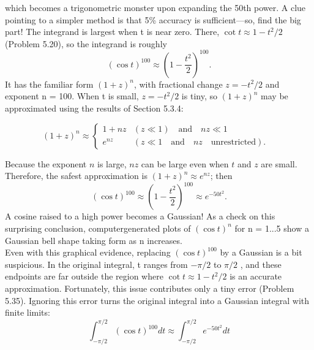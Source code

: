 \documentclass[fleqn]{book}
\newcounter{pro1}
\begin{document}
\Large \textrm{which becomes a trigonometric monster upon expanding the 50th power. 
A clue pointing to a simpler method is that 5\% accuracy is sufficient—so, 
find the big part! The integrand is largest when t is near zero. There,
$\cot t \approx 1-t^{2}/2$ (Problem 5.20), so the integrand is roughly}
\begin{equation}
(\cos t)^{100}\approx \left (1- \frac{t^{2}}{2} \right )^{100} . 
\end{equation}
\Large\textrm{It has the familiar form $(1 + z)^{n}$, with fractional change $z = −t^{2}/2$ and 
exponent n = 100. When t is small, $z = −t^{2}/2$ is tiny, so $(1 + z)^{n}$ may be 
approximated using the results of Section 5.3.4:}
\begin{flushleft}
\begin{equation}
 (1+z)^{n}\approx \left\{\begin{matrix} 1+nz &  (z\ll 1) \quad \textrm{and} \quad nz\ll 1 &\\ e ^{nz}& (z\ll 1 \quad \textrm{and} \quad nz \quad \textrm{unrestricted}) .& \end{matrix}\right.  
\end{equation}
\end{flushleft}
\Large \textrm{Because the exponent $n$ is large, $nz$ can be large even when $t$ and $z$ are 
small. Therefore, the safest approximation is $(1 + z)^{n}\approx e ^{nz}$; then} 
\begin{equation}
(\cos t)^{100}\approx \left (1- \frac{t^{2}}{2} \right )^{100} \approx e ^{-50t^{2}} .
\end{equation}
\Large\textrm{A cosine raised to a high power becomes a Gaussian! 
As a check on this surprising conclusion, computergenerated plots of $(\cos t)^{n}$ for n = 1...5 show a 
Gaussian bell shape taking form as n increases. \\
Even with this graphical evidence, replacing $(\cos t)^{100}$ by a Gaussian is a 
bit suspicious. In the original integral, t ranges from $-\pi /2$ to $\pi /2$ , and 
these endpoints are far outside the region where $\cot t \approx 1-t^{2}/2$ is an 
accurate approximation. Fortunately, this issue contributes only a tiny 
error (Problem 5.35). Ignoring this error turns the original integral into a 
Gaussian integral with finite limits: } 
\begin{equation}
\int_{-\pi /2}^{\pi /2}(\cos t)^{100}dt \approx \int_{-\pi /2}^{\pi /2} e ^{-50t^{2}}dt
\end{equation}


\newpage 
\pagestyle{fancy} 
\renewcommand{\headrulewidth}{0pt} 
\fancyhf{} %
\end{document}

